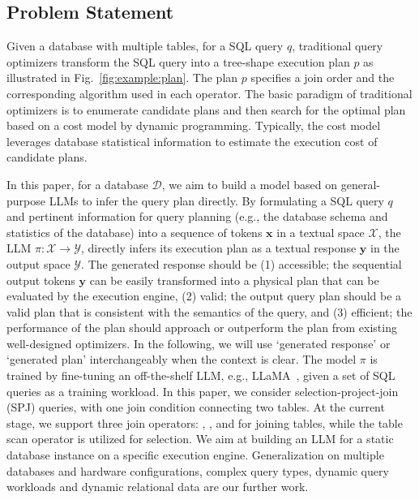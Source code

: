 \subsection{Problem Statement}
\label{sec:background:problem_statement} 
Given a database with multiple tables,
for a SQL query $q$, traditional query optimizers transform the SQL query into a tree-shape execution plan $p$ as illustrated in Fig.~\ref{fig:example:plan}.
The plan $p$ specifies a join order and the corresponding algorithm used in each operator. 
The basic paradigm of traditional optimizers is to enumerate candidate plans and then search for the optimal plan based on a cost model by dynamic programming. 
Typically, the cost model leverages database statistical information to estimate the execution cost of candidate plans. 

In this paper, for a database $\mathcal{D}$, we aim to build 
a model based on general-purpose LLMs 
to infer the query plan directly. 
By formulating a SQL query $q$ and pertinent information for query planning (e.g., the database schema and statistics of the database) into a sequence of tokens $\bm{x}$ in a textual space  $\mathcal{X}$,
the LLM $\pi: \mathcal{X} \rightarrow \mathcal{Y}$, directly infers its execution plan as a textual response $\bm{y}$ in the output space $\mathcal{Y}$.
The generated response should be (1) accessible; the sequential output tokens $\bm{y}$ can be easily transformed into a physical plan that can be evaluated by the execution engine, (2) valid; the output query plan should be a valid plan that is consistent with the semantics of the query, and (3) efficient; the performance of the plan should approach or outperform the plan from existing well-designed optimizers. 
In the following, we will use `generated response' or `generated plan' interchangeably when the context is clear. 
The model $\pi$ is trained by fine-tuning an off-the-shelf LLM, e.g., LLaMA~\cite{DBLP:journals/corr/abs-2302-13971}, given a set of SQL queries as a training workload.  
In this paper, we consider selection-project-join (SPJ) queries, with one join condition connecting two tables. 
At the current stage, we support three join operators: \NestLoop, \MergeJoin, and \HashJoin for joining tables, while the table scan operator \SeqScan is utilized for selection.
We aim at building an LLM for a static database instance on a specific execution engine. Generalization on multiple databases and hardware configurations, complex query types, dynamic query workloads and dynamic relational data are our further work.

